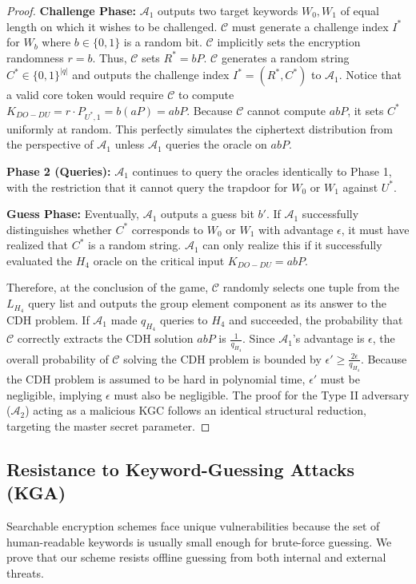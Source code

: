 \documentclass[10pt,journal,compsoc]{IEEEtran}
\begin{document}
\begin{proof}
\textbf{Challenge Phase:} $\mathcal{A}_1$ outputs two target keywords $W_0, W_1$ of equal length on which it wishes to be challenged. $\mathcal{C}$ must generate a challenge index $I^*$ for $W_b$ where $b \in \{0,1\}$ is a random bit. 
$\mathcal{C}$ implicitly sets the encryption randomness $r = b$. Thus, $\mathcal{C}$ sets $R^* = bP$. 
$\mathcal{C}$ generates a random string $C^* \in \{0,1\}^{|q|}$ and outputs the challenge index $I^* = (R^*, C^*)$ to $\mathcal{A}_1$.
Notice that a valid core token would require $\mathcal{C}$ to compute $K_{DO-DU} = r \cdot P_{U^*,1} = b(aP) = abP$. Because $\mathcal{C}$ cannot compute $abP$, it sets $C^*$ uniformly at random. This perfectly simulates the ciphertext distribution from the perspective of $\mathcal{A}_1$ unless $\mathcal{A}_1$ queries the oracle on $abP$.

\textbf{Phase 2 (Queries):} $\mathcal{A}_1$ continues to query the oracles identically to Phase 1, with the restriction that it cannot query the trapdoor for $W_0$ or $W_1$ against $U^*$.

\textbf{Guess Phase:} Eventually, $\mathcal{A}_1$ outputs a guess bit $b'$. 
If $\mathcal{A}_1$ successfully distinguishes whether $C^*$ corresponds to $W_0$ or $W_1$ with advantage $\epsilon$, it must have realized that $C^*$ is a random string. $\mathcal{A}_1$ can only realize this if it successfully evaluated the $H_4$ oracle on the critical input $K_{DO-DU} = abP$. 

Therefore, at the conclusion of the game, $\mathcal{C}$ randomly selects one tuple from the $L_{H_4}$ query list and outputs the group element component as its answer to the CDH problem. If $\mathcal{A}_1$ made $q_{H_4}$ queries to $H_4$ and succeeded, the probability that $\mathcal{C}$ correctly extracts the CDH solution $abP$ is $\frac{1}{q_{H_4}}$.
Since $\mathcal{A}_1$'s advantage is $\epsilon$, the overall probability of $\mathcal{C}$ solving the CDH problem is bounded by $\epsilon' \ge \frac{2\epsilon}{q_{H_4}}$. Because the CDH problem is assumed to be hard in polynomial time, $\epsilon'$ must be negligible, implying $\epsilon$ must also be negligible. The proof for the Type II adversary ($\mathcal{A}_2$) acting as a malicious KGC follows an identical structural reduction, targeting the master secret parameter.
\end{proof}

\subsection{Resistance to Keyword-Guessing Attacks (KGA)}
Searchable encryption schemes face unique vulnerabilities because the set of human-readable keywords is usually small enough for brute-force guessing. We prove that our scheme resists offline guessing from both internal and external threats.
\end{document}
